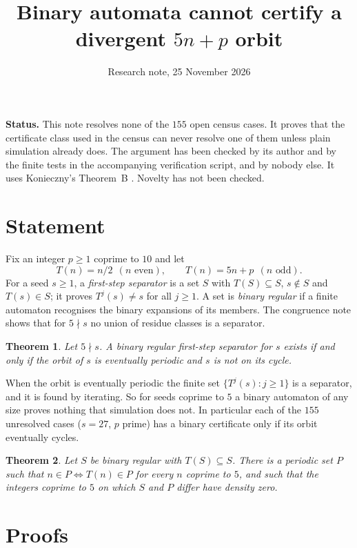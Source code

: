 \documentclass[11pt]{article}
\title{Binary automata cannot certify a divergent $5n+p$ orbit}
\author{Research note, 25 November 2026}
\date{}
\newtheorem{theorem}{Theorem}
\theoremstyle{remark}
\begin{document}
\maketitle

\noindent\textbf{Status.} This note resolves none of the $155$ open census
cases. It proves that the certificate class used in the census can never
resolve one of them unless plain simulation already does. The argument has been
checked by its author and by the finite tests in the accompanying
verification script, and by nobody else. It uses
Konieczny's Theorem~B \cite{K}. Novelty has not been checked.

\section{Statement}

Fix an integer $p\ge1$ coprime to $10$ and let
\[
T(n)=n/2\ \ (n\text{ even}),\qquad T(n)=5n+p\ \ (n\text{ odd}).
\]
For a seed $s\ge1$, a \emph{first-step separator} is a set $S$ with
$T(S)\subseteq S$, $s\notin S$ and $T(s)\in S$; it proves $T^j(s)\ne s$ for all
$j\ge1$. A set is \emph{binary regular} if a finite automaton recognises the
binary expansions of its members. The congruence note shows that for
$5\nmid s$ no union of residue classes is a separator.

\begin{theorem}\label{main}
Let $5\nmid s$. A binary regular first-step separator for $s$ exists if and
only if the orbit of $s$ is eventually periodic and $s$ is not on its cycle.
\end{theorem}

When the orbit is eventually periodic the finite set $\{T^j(s):j\ge1\}$ is a
separator, and it is found by iterating. So for seeds coprime to $5$ a binary
automaton of any size proves nothing that simulation does not. In particular
each of the $155$ unresolved cases ($s=27$, $p$ prime) has a binary certificate
only if its orbit eventually cycles.

\begin{theorem}\label{structure}
Let $S$ be binary regular with $T(S)\subseteq S$. There is a periodic set $P$
such that $n\in P\iff T(n)\in P$ for every $n$ coprime to $5$, and such that
the integers coprime to $5$ on which $S$ and $P$ differ have density zero.
\end{theorem}

\section{Proofs}
\end{document}
